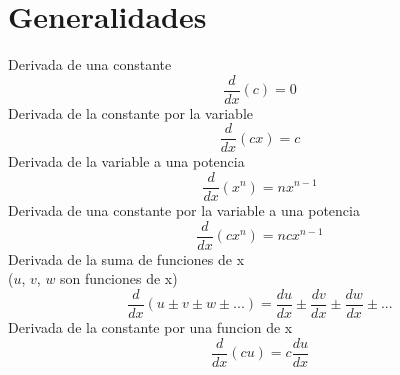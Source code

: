 \section{Generalidades}
Derivada de una constante
\begin{equation*}
	\frac{d}{dx}(c)=0
\end{equation*}
Derivada de la constante por la variable
\begin{equation*}
	\frac{d}{dx}(cx)=c
\end{equation*}
Derivada de la variable a una potencia
\begin{equation*}
	\frac{d}{dx}(x^n)=nx^{n-1}
\end{equation*}
Derivada de una constante por la variable a una potencia
\begin{equation*}
	\frac{d}{dx}(cx^n)=ncx^{n-1}
\end{equation*}
Derivada de la suma de funciones de x\\
($u$, $v$, $w$ son funciones de x)
\begin{equation*}
	\frac{d}{dx}(u\pm v\pm w \pm ...)=\frac{du}{dx}\pm\frac{dv}{dx}\pm\frac{dw}{dx}\pm...
\end{equation*}
Derivada de la constante por una funcion de x
\begin{equation*}
	\frac{d}{dx}(cu)=c\frac{du}{dx}
\end{equation*}